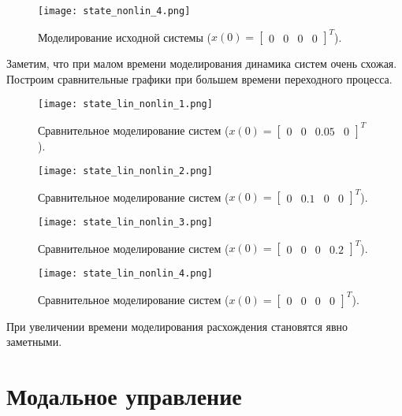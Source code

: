 \begin{figure}[]
    \centering
    \texttt{[image: state\_nonlin\_4.png]}
    \caption{\label{fig:task2_4_4}Моделирование исходной системы ($x(0)=\begin{bmatrix}
        0 & 0 & 0 & 0
    \end{bmatrix}^T$).}
\end{figure}
\pagebreak
Заметим, что при малом времени моделирования динамика систем очень схожая. Построим сравнительные графики при большем времени переходного процесса.

\begin{figure}[]
    \centering
    \texttt{[image: state\_lin\_nonlin\_1.png]}
    \caption{\label{fig:task2_4_5}Сравнительное моделирование систем ($x(0)=\begin{bmatrix}
        0 & 0 & 0.05 & 0
    \end{bmatrix}^T$).}
\end{figure}

\begin{figure}[]
    \centering
    \texttt{[image: state\_lin\_nonlin\_2.png]}
    \caption{\label{fig:task2_4_6}Сравнительное моделирование систем ($x(0)=\begin{bmatrix}
        0 & 0.1 & 0 & 0
    \end{bmatrix}^T$).}
\end{figure}

\begin{figure}[]
    \centering
    \texttt{[image: state\_lin\_nonlin\_3.png]}
    \caption{\label{fig:task2_4_7}Сравнительное моделирование систем ($x(0)=\begin{bmatrix}
        0 & 0 & 0 & 0.2
    \end{bmatrix}^T$).}
\end{figure}

\begin{figure}[]
    \centering
    \texttt{[image: state\_lin\_nonlin\_4.png]}
    \caption{\label{fig:task2_4_8}Сравнительное моделирование систем ($x(0)=\begin{bmatrix}
        0 & 0 & 0 & 0
    \end{bmatrix}^T$).}
\end{figure}

\pagebreak
При увеличении времени моделирования расхождения становятся явно заметными.

\section{Модальное управление}

